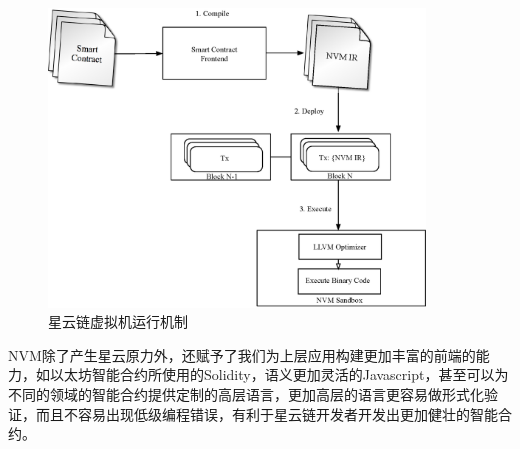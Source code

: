 \begin{figure}[h]
\centering
\includegraphics[width=10cm]{./figs/nvm-process}
\caption{星云链虚拟机运行机制}
\label{fig:nvm-process}
\end{figure}

NVM除了产生星云原力外，还赋予了我们为上层应用构建更加丰富的前端的能力，如以太坊智能合约所使用的Solidity，语义更加灵活的Javascript，甚至可以为不同的领域的智能合约提供定制的高层语言，更加高层的语言更容易做形式化验证，而且不容易出现低级编程错误，有利于星云链开发者开发出更加健壮的智能合约。